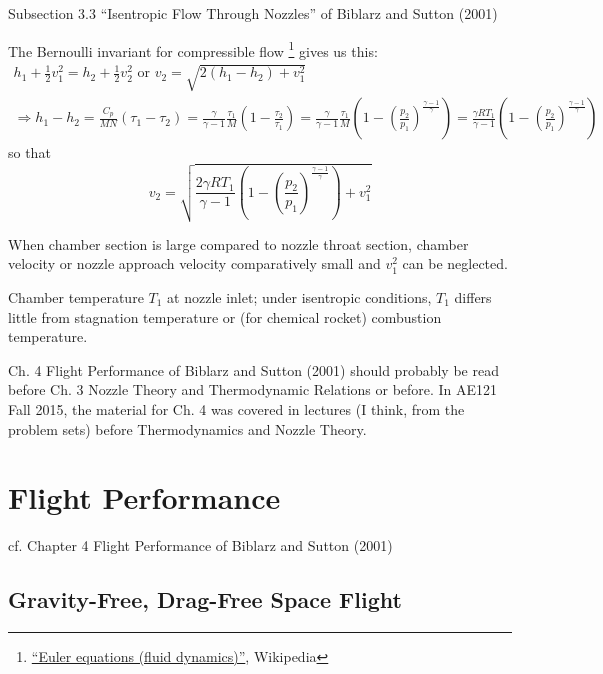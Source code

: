 \documentclass[10pt]{amsart}
\begin{document}
\begin{multicols*}{2}
Subsection 3.3 ``Isentropic Flow Through Nozzles'' of Biblarz and Sutton (2001) \cite{GSuttonOBiblarz2001} 

The Bernoulli invariant for compressible flow \footnote{\href{https://en.wikipedia.org/wiki/Euler_equations_\%28fluid_dynamics\%29\#Compressible_case}{``Euler equations (fluid dynamics)''}, Wikipedia} gives us this:
\[
\begin{gathered}
  h_1 + \frac{1}{2} v_1^2 = h_2 + \frac{1}{2} v_2^2 \text{ or } v_2 = \sqrt{ 2 (h_1 - h_2) + v_1^2 } \\
\Longrightarrow h_1 - h_2 = \frac{C_p}{MN}(\tau_1 - \tau_2) = \frac{ \gamma}{ \gamma -1} \frac{\tau_1}{M} \left( 1 - \frac{\tau_2}{\tau_1} \right) = \frac{ \gamma}{\gamma-1} \frac{\tau_1}{M} \left( 1 - \left( \frac{p_2}{p_1} \right)^{\frac{\gamma-1}{\gamma} } \right) = \frac{\gamma RT_1}{ \gamma -1} (1 - \left( \frac{p_2}{p_1} \right)^{\frac{\gamma-1}{\gamma } } )
\end{gathered}
\]
so that 
\[
v_2  = \sqrt{ \frac{2\gamma RT_1}{\gamma -1} \left(1- \left( \frac{p_2}{p_1} \right)^{\frac{\gamma-1}{\gamma} } \right) + v_1^2}
\]

When chamber section is large compared to nozzle throat section, chamber velocity or nozzle approach velocity comparatively small and $v_1^2$ can be neglected.\cite{GSuttonOBiblarz2001}

Chamber temperature $T_1$ at nozzle inlet; under isentropic conditions, $T_1$ differs little from stagnation temperature or (for chemical rocket) combustion temperature.\cite{GSuttonOBiblarz2001}

  

Ch. 4 Flight Performance of Biblarz and Sutton (2001) \cite{GSuttonOBiblarz2001} should probably be read before Ch. 3 Nozzle Theory and Thermodynamic Relations or before.  In AE121 Fall 2015, the material for Ch. 4 was covered in lectures (I think, from the problem sets) before Thermodynamics and Nozzle Theory.  

\cite{GSuttonOBiblarz2001}

\section{Flight Performance}

cf. Chapter 4 Flight Performance of Biblarz and Sutton (2001) \cite{GSuttonOBiblarz2001} 

\subsection{Gravity-Free, Drag-Free Space Flight}


\end{multicols*}
\end{document}
